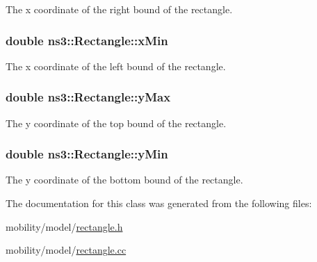 The x coordinate of the right bound of the rectangle. 

\subsubsection[{\texorpdfstring{x\+Min}{xMin}}]{\setlength{\rightskip}{0pt plus 5cm}double ns3\+::\+Rectangle\+::x\+Min}\hypertarget{classns3_1_1Rectangle_ad02246cec7de9b3eea3eb727dae274ac}{}\label{classns3_1_1Rectangle_ad02246cec7de9b3eea3eb727dae274ac}


The x coordinate of the left bound of the rectangle. 

\subsubsection[{\texorpdfstring{y\+Max}{yMax}}]{\setlength{\rightskip}{0pt plus 5cm}double ns3\+::\+Rectangle\+::y\+Max}\hypertarget{classns3_1_1Rectangle_a272ebb19702453c2fa7846b5c9c76b1c}{}\label{classns3_1_1Rectangle_a272ebb19702453c2fa7846b5c9c76b1c}


The y coordinate of the top bound of the rectangle. 

\subsubsection[{\texorpdfstring{y\+Min}{yMin}}]{\setlength{\rightskip}{0pt plus 5cm}double ns3\+::\+Rectangle\+::y\+Min}\hypertarget{classns3_1_1Rectangle_afb85ffe9ede5c0c178e9ec2bde4e5a8e}{}\label{classns3_1_1Rectangle_afb85ffe9ede5c0c178e9ec2bde4e5a8e}


The y coordinate of the bottom bound of the rectangle. 



The documentation for this class was generated from the following files\+:\begin{DoxyCompactItemize}
\item 
mobility/model/\hyperlink{rectangle_8h}{rectangle.\+h}\item 
mobility/model/\hyperlink{rectangle_8cc}{rectangle.\+cc}\end{DoxyCompactItemize}
